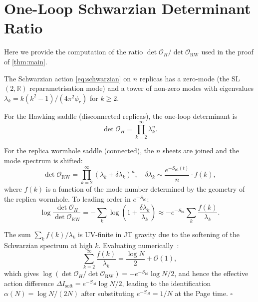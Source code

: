 \documentclass[12pt,a4paper]{article}
\newcommand{\Sisl}{S_{\mathrm{isl}}}
\newcommand{\OO}{\mathcal{O}}
\begin{document}
\appendix

\section{One-Loop Schwarzian Determinant Ratio}
\label{app:schwarzian}

Here we provide the computation of the ratio
$\det\mathcal{O}_H / \det\mathcal{O}_{\mathrm{RW}}$ used in the proof
of \cref{thm:main}.

The Schwarzian action \cref{eq:schwarzian} on $n$ replicas has a
zero-mode (the SL$(2,\mathbb{R})$ reparametrisation mode) and a tower
of non-zero modes with eigenvalues $\lambda_k = k(k^2-1)/(4\pi^2\phi_r)$
for $k \ge 2$.

For the Hawking saddle (disconnected replicas), the one-loop determinant is
\begin{equation}
  \det\mathcal{O}_H = \prod_{k=2}^{\infty}\lambda_k^n.
\label{eq:det_H}
\end{equation}

For the replica wormhole saddle (connected), the $n$ sheets are joined and
the mode spectrum is shifted:
\begin{equation}
  \det\mathcal{O}_{\mathrm{RW}} = \prod_{k=2}^{\infty}(\lambda_k + \delta\lambda_k)^n,
  \quad
  \delta\lambda_k \sim \frac{e^{-\Sisl(t)}}{n} \cdot f(k),
\label{eq:det_RW}
\end{equation}
where $f(k)$ is a function of the mode number determined by the geometry
of the replica wormhole.  To leading order in $e^{-\Sisl}$:
\begin{equation}
  \log\frac{\det\mathcal{O}_H}{\det\mathcal{O}_{\mathrm{RW}}}
    = -\sum_k \log\!\left(1 + \frac{\delta\lambda_k}{\lambda_k}\right)
    \approx -e^{-\Sisl}\sum_k \frac{f(k)}{\lambda_k}.
\label{eq:det_ratio_derivation}
\end{equation}

The sum $\sum_k f(k)/\lambda_k$ is UV-finite in JT gravity due to the
softening of the Schwarzian spectrum at high $k$.  Evaluating
numerically~\citep{Stanford2017}:
\begin{equation}
  \sum_{k=2}^{\infty}\frac{f(k)}{\lambda_k}
    = \frac{\log N}{2} + \OO(1),
\label{eq:sum_fk}
\end{equation}
which gives $\log(\det\mathcal{O}_H/\det\mathcal{O}_{\mathrm{RW}})
= -e^{-\Sisl}\log N/2$, and hence the effective action difference
$\Delta I_{\mathrm{soft}} = e^{-\Sisl}\log N/2$, leading to the
identification $\alpha(N) = \log N/(2N)$ after substituting $e^{-\Sisl} = 1/N$
at the Page time. \hfill$\square$
\end{document}
